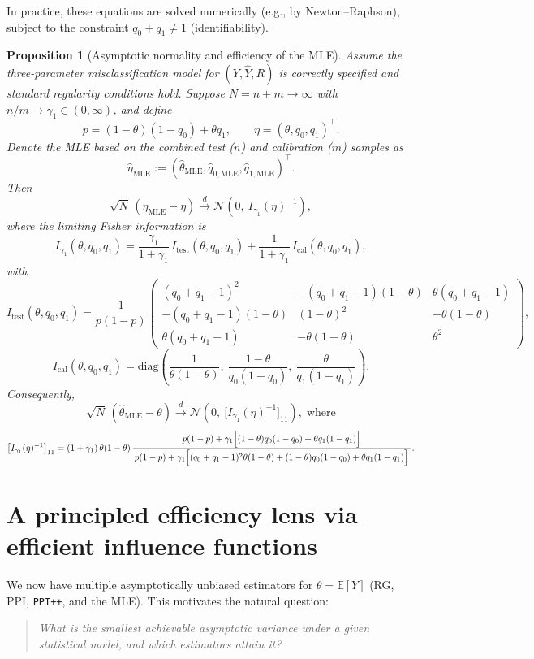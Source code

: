 \documentclass[11pt]{article}
\newcommand{\E}{\mathbb{E}}
\newcommand{\1}{\mathbf{1}}
\newtheorem{proposition}{Proposition}
\theoremstyle{remark}
\begin{document}
In practice, these equations are solved numerically (e.g., by Newton--Raphson), subject to the
constraint $q_0+q_1\neq 1$ (identifiability).

\begin{proposition}[Asymptotic normality and efficiency of the MLE]
\label{prop:mle-asymp}
Assume the three-parameter misclassification model for $(Y,\hat Y, R)$ is correctly specified and standard
regularity conditions hold. Suppose $N=n+m\to\infty$ with $n/m\to\gamma_1\in(0,\infty)$, and define
\[
p=(1-\theta)(1-q_0)+\theta q_1,
\qquad
\eta=(\theta,q_0,q_1)^\top.
\]
Denote the MLE based on the combined test ($n$) and calibration ($m$) samples as
\[
\hat\eta_{\mathrm{MLE}}
:=
(\hat\theta_{\mathrm{MLE}},\hat q_{0,\mathrm{MLE}},\hat q_{1,\mathrm{MLE}})^\top.
\]
Then
\[
\sqrt{N}\,(\hat\eta_{\mathrm{MLE}}-\eta)\xrightarrow{d}\mathcal N\!\left(0,\ I_{\gamma_1}(\eta)^{-1}\right),
\]
where the limiting Fisher information is
\[
I_{\gamma_1}(\theta,q_0,q_1)
=
\frac{\gamma_1}{1+\gamma_1}\,I_{\mathrm{test}}(\theta,q_0,q_1)
+
\frac{1}{1+\gamma_1}\,I_{\mathrm{cal}}(\theta,q_0,q_1),
\]
with
\[
I_{\mathrm{test}}(\theta,q_0,q_1)
=
\frac{1}{p(1-p)}
\begin{pmatrix}
(q_0+q_1-1)^2 & -(q_0+q_1-1)(1-\theta) & \theta(q_0+q_1-1)\\
-(q_0+q_1-1)(1-\theta) & (1-\theta)^2 & -\theta(1-\theta)\\
\theta(q_0+q_1-1) & -\theta(1-\theta) & \theta^2
\end{pmatrix},
\]
\[
I_{\mathrm{cal}}(\theta,q_0,q_1)
=
\mathrm{diag}\!\left(
\frac{1}{\theta(1-\theta)},\ 
\frac{1-\theta}{q_0(1-q_0)},\ 
\frac{\theta}{q_1(1-q_1)}
\right).
\]
Consequently,
\[
\sqrt{N}\,(\hat\theta_{\mathrm{MLE}}-\theta)\xrightarrow{d}\mathcal N\!\left(0,\ \bigl[I_{\gamma_1}(\eta)^{-1}\bigr]_{11}\right), \; \text{where}
\]
\[
\bigl[I_{\gamma_1}(\eta)^{-1}\bigr]_{11}
=
(1+\gamma_1)\,\theta(1-\theta)\,
\frac{\,p(1-p)+\gamma_1\Bigl[(1-\theta)q_0(1-q_0)+\theta q_1(1-q_1)\Bigr]\;}
{\,p(1-p)+\gamma_1\Bigl[(q_0+q_1-1)^2\theta(1-\theta)+(1-\theta)q_0(1-q_0)+\theta q_1(1-q_1)\Bigr]\;}.
\]
\end{proposition}



\section{A principled efficiency lens via efficient influence functions}
\label{sec:eif}

We now have multiple asymptotically unbiased estimators for $\theta=\E[Y]$ (RG, PPI,
\texttt{PPI++}, and the MLE). This motivates the natural question:
\begin{quote}
    \emph{What is the smallest achievable asymptotic variance under a given statistical model, and which
estimators attain it?}
\end{quote}
\end{document}
